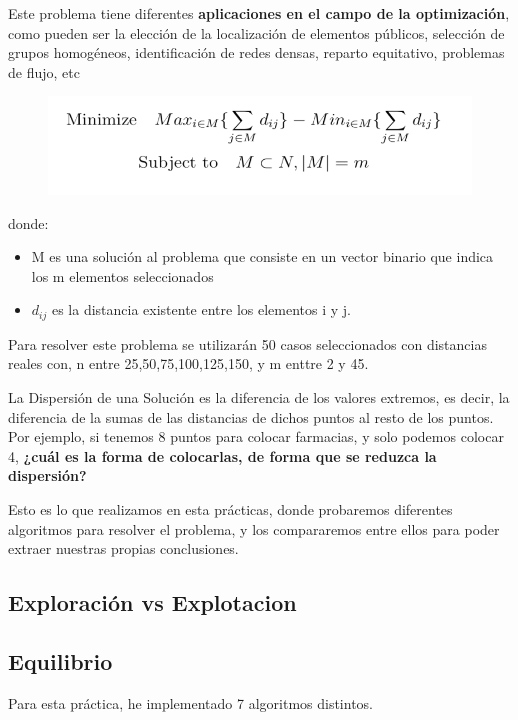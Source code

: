 \documentclass{article}
\begin{document}
Este problema tiene diferentes \textbf{aplicaciones en el campo de la optimización},
como pueden ser la elección de la localización de elementos públicos, selección
de grupos homogéneos, identificación de redes densas, reparto equitativo, problemas
de flujo, etc

\begin{figure}[h]
    \centering
    \includegraphics[scale=0.5]{FormulaMinimizacion.png}
\end{figure}

donde:
\begin{itemize}
\item M es una solución al problema que consiste en un vector binario que indica los m
elementos seleccionados
\item$d_{ij}$ es la distancia existente entre los elementos i y j.
\end{itemize}

Para resolver este problema se utilizarán 50 casos seleccionados con distancias reales
con, n entre {25,50,75,100,125,150}, y m enttre 2 y 45.

\vspace{5mm} 

La Dispersión de una Solución es la diferencia de los valores extremos, es decir,
la diferencia de la sumas de las distancias de dichos puntos al resto de los puntos.
Por ejemplo, si tenemos 8 puntos para colocar farmacias, y solo podemos colocar 4,
\textbf{¿cuál es la forma de colocarlas, de forma que se reduzca la dispersión?}

\vspace{5mm}

Esto es lo que realizamos en esta prácticas, donde probaremos diferentes algoritmos
para resolver el problema, y los compararemos entre ellos para poder extraer nuestras
propias conclusiones.

\newpage

\subsection{\normalsize Exploración vs Explotacion}
\subsection{\normalsize Equilibrio}
Para esta práctica, he implementado 7 algoritmos distintos.
\end{document}
